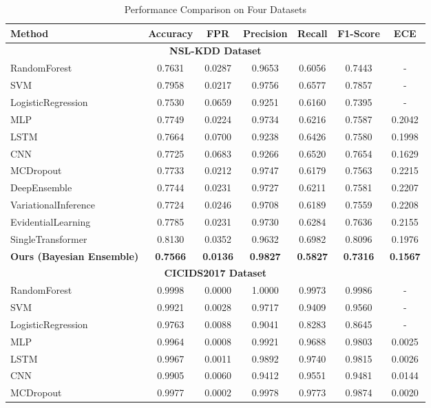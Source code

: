 \begin{table}[htbp]
\centering
\caption{Performance Comparison on Four Datasets}
\label{tab:main_performance}
\begin{tabular}{l|ccccc|c}
\hline
\textbf{Method} & \textbf{Accuracy} & \textbf{FPR} & \textbf{Precision} & \textbf{Recall} & \textbf{F1-Score} & \textbf{ECE} \\
\hline
\multicolumn{7}{c}{\textbf{NSL-KDD Dataset}} \\
\hline
RandomForest & 0.7631 & 0.0287 & 0.9653 & 0.6056 & 0.7443 & - \\
SVM & 0.7958 & 0.0217 & 0.9756 & 0.6577 & 0.7857 & - \\
LogisticRegression & 0.7530 & 0.0659 & 0.9251 & 0.6160 & 0.7395 & - \\
MLP & 0.7749 & 0.0224 & 0.9734 & 0.6216 & 0.7587 & 0.2042 \\
LSTM & 0.7664 & 0.0700 & 0.9238 & 0.6426 & 0.7580 & 0.1998 \\
CNN & 0.7725 & 0.0683 & 0.9266 & 0.6520 & 0.7654 & 0.1629 \\
MCDropout & 0.7733 & 0.0212 & 0.9747 & 0.6179 & 0.7563 & 0.2215 \\
DeepEnsemble & 0.7744 & 0.0231 & 0.9727 & 0.6211 & 0.7581 & 0.2207 \\
VariationalInference & 0.7724 & 0.0246 & 0.9708 & 0.6189 & 0.7559 & 0.2208 \\
EvidentialLearning & 0.7785 & 0.0231 & 0.9730 & 0.6284 & 0.7636 & 0.2155 \\
SingleTransformer & 0.8130 & 0.0352 & 0.9632 & 0.6982 & 0.8096 & 0.1976 \\
\textbf{Ours (Bayesian Ensemble)} & \textbf{0.7566} & \textbf{0.0136} & \textbf{0.9827} & \textbf{0.5827} & \textbf{0.7316} & \textbf{0.1567} \\
\hline
\multicolumn{7}{c}{\textbf{CICIDS2017 Dataset}} \\
\hline
RandomForest & 0.9998 & 0.0000 & 1.0000 & 0.9973 & 0.9986 & - \\
SVM & 0.9921 & 0.0028 & 0.9717 & 0.9409 & 0.9560 & - \\
LogisticRegression & 0.9763 & 0.0088 & 0.9041 & 0.8283 & 0.8645 & - \\
MLP & 0.9964 & 0.0008 & 0.9921 & 0.9688 & 0.9803 & 0.0025 \\
LSTM & 0.9967 & 0.0011 & 0.9892 & 0.9740 & 0.9815 & 0.0026 \\
CNN & 0.9905 & 0.0060 & 0.9412 & 0.9551 & 0.9481 & 0.0144 \\
MCDropout & 0.9977 & 0.0002 & 0.9978 & 0.9773 & 0.9874 & 0.0020 \\

\end{tabular}
\end{table}

